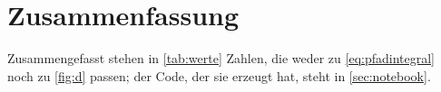 \section{Zusammenfassung}

\blindtext

Zusammengefasst stehen in \cref{tab:werte} Zahlen, die weder zu
\cref{eq:pfadintegral} noch zu \cref{fig:d} passen; der Code, der sie
erzeugt hat, steht in \cref{sec:notebook}.
